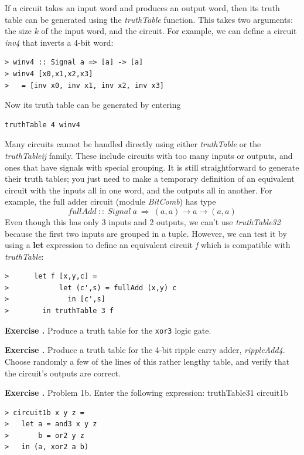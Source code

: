 \documentclass[a4paper,openany,fleqn]{book}
\newcounter{exercisenum}
\newenvironment*{exercise}
  {\addtocounter{exercisenum}{1}
   \vspace{10pt}\noindent\textbf{Exercise \arabic{exercisenum}. }}
  {}
\begin{document}
If a circuit takes an input word and produces an output word, then its
truth table can be generated using the \textit{truthTable} function.
This takes two arguments: the size $k$ of the input word, and the
circuit.  For example, we can define a circuit \textit{inv4} that
inverts a 4-bit word:
\begin{verbatim}
> winv4 :: Signal a => [a] -> [a]
> winv4 [x0,x1,x2,x3]
>   = [inv x0, inv x1, inv x2, inv x3]
\end{verbatim}
Now its truth table can be generated by entering
\begin{verbatim}
truthTable 4 winv4
\end{verbatim}

Many circuits cannot be handled directly using either
\textit{truthTable} or the \textit{truthTableij} family.  These
include circuits with too many inputs or outputs, and ones that have
signals with special grouping.  It is still straightforward to
generate their truth tables; you just need to make a temporary
definition of an equivalent circuit with the inputs all in one word,
and the outputs all in another.  For example, the full adder circuit
(module \textit{BitComb}) has type
\begin{equation}
  \label{eq:3}
  \mathit{fullAdd}\ ::\ \mathit{Signal}\ a\ \Rightarrow\
    (a,a) \rightarrow a \rightarrow (a,a)
\end{equation}
Even though this has only 3 inputs and 2 outputs, we can't use
\textit{truthTable32} because the first two inputs are grouped in a
tuple.  However, we can test it by using a \textbf{let} expression to
define an equivalent circuit \textit{f} which is compatible with
\textit{truthTable}:
\begin{verbatim}
>      let f [x,y,c] =
>            let (c',s) = fullAdd (x,y) c
>              in [c',s]
>        in truthTable 3 f
\end{verbatim}

\begin{exercise}
Produce a truth table for the \texttt{xor3} logic gate.
\end{exercise}

\begin{exercise}
  Produce a truth table for the 4-bit ripple carry adder,
  \textit{rippleAdd4}.  Choose randomly a few of the lines of this
  rather lengthy table, and verify that the circuit's outputs are
  correct.
\end{exercise}

\begin{exercise}
Problem 1b.  Enter the following expression:
truthTable31 circuit1b
\begin{verbatim}
> circuit1b x y z =
>   let a = and3 x y z
>       b = or2 y z
>   in (a, xor2 a b)
\end{verbatim}
\end{exercise}
\end{document}
